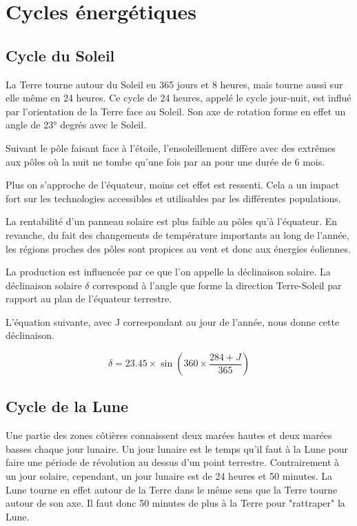 \chapter{Cycles énergétiques}
\section{Cycle du Soleil}

La Terre tourne autour du Soleil en 365 jours et 8 heures, mais tourne aussi sur elle même en 24 heures.
Ce cycle de 24 heures, appelé le cycle jour-nuit, est influé par l'orientation de la Terre face au Soleil.
Son axe de rotation forme en effet un angle de 23° degrés avec le Soleil.

Suivant le pôle faisant face à l'étoile, l'ensoleillement diffère avec des extrêmes aux pôles où la nuit ne tombe
qu'une fois par an pour une durée de 6 mois.

Plus on s'approche de l'équateur, moins cet effet est ressenti. Cela a un impact fort sur les technologies
accessibles et utilisables par les différentes populations.

La rentabilité d'un panneau solaire est plus faible au pôles qu'à l'équateur.
En revanche, du fait des changements de température importants au long de l'année, les régions proches des pôles
sont propices au vent et donc aux énergies éoliennes.

La production est influencée par ce que l'on appelle la déclinaison solaire.
La déclinaison solaire $\delta$ correspond à l’angle que forme la direction
Terre-Soleil par rapport au plan de l’équateur terrestre.

L'équation suivante, avec J correspondant au jour de l'année, nous donne cette déclinaison.

\begin{equation}
  \delta = 23.45 \times \sin \left( 360 \times \frac{284 + J}{365} \right)
\end{equation}

\section{Cycle de la Lune}

Une partie des zones côtières connaissent deux marées hautes et deux marées basses chaque jour lunaire.
Un jour lunaire est le temps qu'il faut à la Lune pour faire une période de révolution au dessus d'un point terrestre.
Contrairement à un jour solaire, cependant, un jour lunaire est de 24 heures et 50 minutes.
La Lune tourne en effet autour de la Terre dans le même sens que la Terre tourne autour de son axe.
Il faut donc 50 minutes de plus à la Terre pour "rattraper" la Lune.

